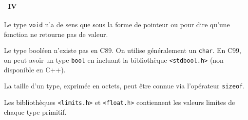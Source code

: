 \begin{frame}[containsverbatim]
  \frametitle{\secname}
  \framesubtitle{\subsecname~IV}
  
  \par
  Le type \verb|void| n'a de sens que sous la forme de pointeur ou pour dire qu'une fonction ne retourne pas de valeur.
  \vspace{0.5cm}
  \par
  Le type booléen n'existe pas en C89. On utilise généralement un \verb|char|. En C99, on peut avoir un type \verb|bool| en incluant la bibliothèque \verb|<stdbool.h>| (non disponible en C++).
  \vspace{0.5cm}
  \par
  La taille d'un type, exprimée en octets, peut être connue via l'opérateur \texttt{sizeof}.
  \vspace{0.5cm}
  \par
  Les bibliothèques \verb|<limits.h>| et \verb|<float.h>| contiennent les valeurs limites de chaque type primitif.
\end{frame}

